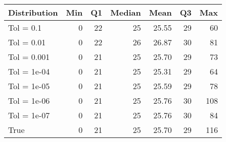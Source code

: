 
\begin{center}
\begin{tabular}{lrrrrrr}
 Distribution & Min & Q1 & Median & Mean & Q3 & Max \\ 
  \hline
\hline
Tol =  0.1 & 0 & 22 & 25 & 25.55 & 29 & 60 \\ 
  Tol =  0.01 & 0 & 22 & 26 & 26.87 & 30 & 81 \\ 
  Tol =  0.001 & 0 & 21 & 25 & 25.70 & 29 & 73 \\ 
  Tol =  1e-04 & 0 & 21 & 25 & 25.31 & 29 & 64 \\ 
  Tol =  1e-05 & 0 & 21 & 25 & 25.59 & 29 & 78 \\ 
  Tol =  1e-06 & 0 & 21 & 25 & 25.76 & 30 & 108 \\ 
  Tol =  1e-07 & 0 & 21 & 25 & 25.76 & 30 & 84 \\ 
  True & 0 & 21 & 25 & 25.70 & 29 & 116 \\ 
  \end{tabular}
\end{center}
\label{tab:SummaryTable}